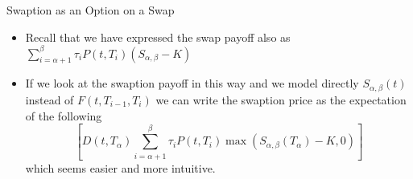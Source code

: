 \documentclass{beamer}
\begin{document}
\begin{frame}{Swaption as an Option on a Swap}
	\begin{itemize}
			\item Recall that we have expressed the swap payoff also as $
					\sum_{i=\alpha+1}^\beta \tau_i P(t,T_i)(S_{\alpha,\beta}-K)$
					
			\item If we look at the swaption payoff in this way and we model directly $S_{\alpha,\beta}(t)$ instead of $F(t, T_{i-1},T_i)$ we can write the swaption price as the expectation of the following
			\begin{equation}
					\left[D(t,T_\alpha)\sum_{i=\alpha+1}^\beta \tau_i P(t,T_i)\max(S_{\alpha,\beta}(T_\alpha)-K, 0)\right]
				\end{equation}
			which seems easier and more intuitive.
		\end{itemize}
\end{frame}

%
\end{document}
